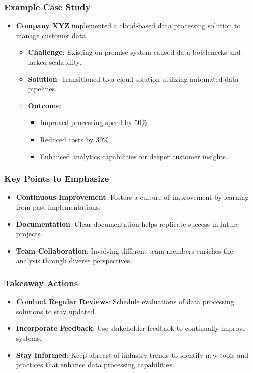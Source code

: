 \documentclass[aspectratio=169]{beamer}
\begin{document}
\begin{frame}[fragile]
    \frametitle{Example Case Study}
    \begin{itemize}
        \item \textbf{Company XYZ} implemented a cloud-based data processing solution to manage customer data.
        \begin{itemize}
            \item \textbf{Challenge}: Existing on-premise system caused data bottlenecks and lacked scalability.
            \item \textbf{Solution}: Transitioned to a cloud solution utilizing automated data pipelines.
            \item \textbf{Outcome}:
            \begin{itemize}
                \item Improved processing speed by 50\%
                \item Reduced costs by 30\%
                \item Enhanced analytics capabilities for deeper customer insights.
            \end{itemize}
        \end{itemize}
    \end{itemize}
\end{frame}

\begin{frame}[fragile]
    \frametitle{Key Points to Emphasize}
    \begin{itemize}
        \item \textbf{Continuous Improvement}: Fosters a culture of improvement by learning from past implementations.
        \item \textbf{Documentation}: Clear documentation helps replicate success in future projects.
        \item \textbf{Team Collaboration}: Involving different team members enriches the analysis through diverse perspectives.
    \end{itemize}
\end{frame}

\begin{frame}[fragile]
    \frametitle{Takeaway Actions}
    \begin{itemize}
        \item \textbf{Conduct Regular Reviews}: Schedule evaluations of data processing solutions to stay updated.
        \item \textbf{Incorporate Feedback}: Use stakeholder feedback to continually improve systems.
        \item \textbf{Stay Informed}: Keep abreast of industry trends to identify new tools and practices that enhance data processing capabilities.
    \end{itemize}
\end{frame}
\end{document}
